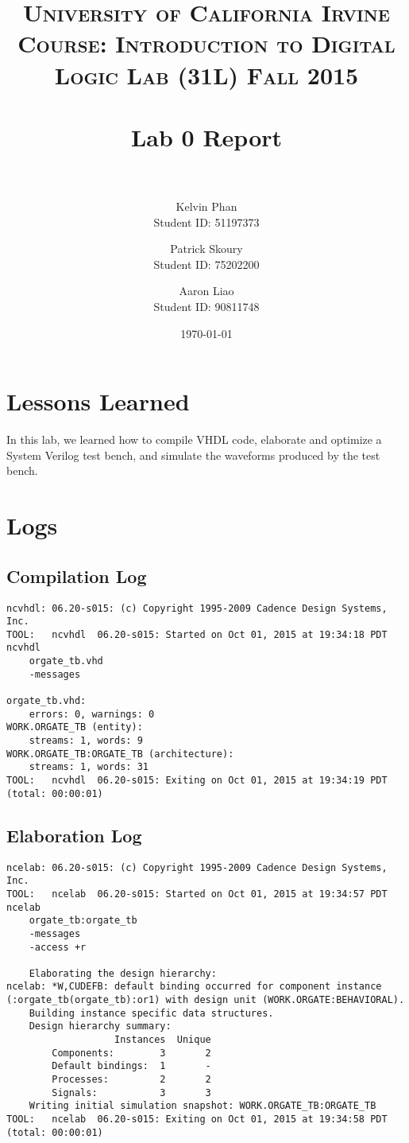 \documentclass[paper=letter, fontsize=11pt]{scrartcl} %
\title{	
\normalfont \normalsize 
\textsc{University of California Irvine} \\  %
\textsc{Course: Introduction to Digital Logic Lab (31L) Fall 2015} \\ [25pt]
\horrule{0.5pt} \\[0.4cm] %
\huge Lab 0 Report\\ %
\horrule{2pt} \\[0.5cm] %
}
\author{Kelvin Phan \\ Student ID: 51197373
	\and
	Patrick Skoury \\ Student ID: 75202200 %
	\and
	Aaron Liao \\ Student ID: 90811748 %
}
\date{\large\today} %
\numberwithin{equation}{section} %
\numberwithin{figure}{section} %
\numberwithin{table}{section} %
\begin{document}
\maketitle %


\section{Lessons Learned}


In this lab, we learned how to compile VHDL code, elaborate and optimize a System Verilog test bench, and simulate the waveforms produced by the test bench. 

\section{Logs}

\subsection{Compilation Log}

\begin{verbatim}
ncvhdl: 06.20-s015: (c) Copyright 1995-2009 Cadence Design Systems, Inc.
TOOL:	ncvhdl	06.20-s015: Started on Oct 01, 2015 at 19:34:18 PDT
ncvhdl
    orgate_tb.vhd
    -messages

orgate_tb.vhd:
	errors: 0, warnings: 0
WORK.ORGATE_TB (entity):
	streams: 1, words: 9
WORK.ORGATE_TB:ORGATE_TB (architecture):
	streams: 1, words: 31
TOOL:	ncvhdl	06.20-s015: Exiting on Oct 01, 2015 at 19:34:19 PDT  (total: 00:00:01)

\end{verbatim}

\subsection{Elaboration Log}

\begin{verbatim}
ncelab: 06.20-s015: (c) Copyright 1995-2009 Cadence Design Systems, Inc.
TOOL:	ncelab	06.20-s015: Started on Oct 01, 2015 at 19:34:57 PDT
ncelab
    orgate_tb:orgate_tb
    -messages
    -access +r

	Elaborating the design hierarchy:
ncelab: *W,CUDEFB: default binding occurred for component instance (:orgate_tb(orgate_tb):or1) with design unit (WORK.ORGATE:BEHAVIORAL).
	Building instance specific data structures.
	Design hierarchy summary:
		           Instances  Unique
		Components:        3       2
		Default bindings:  1       -
		Processes:         2       2
		Signals:           3       3
	Writing initial simulation snapshot: WORK.ORGATE_TB:ORGATE_TB
TOOL:	ncelab	06.20-s015: Exiting on Oct 01, 2015 at 19:34:58 PDT  (total: 00:00:01)

\end{verbatim}
\end{document}
